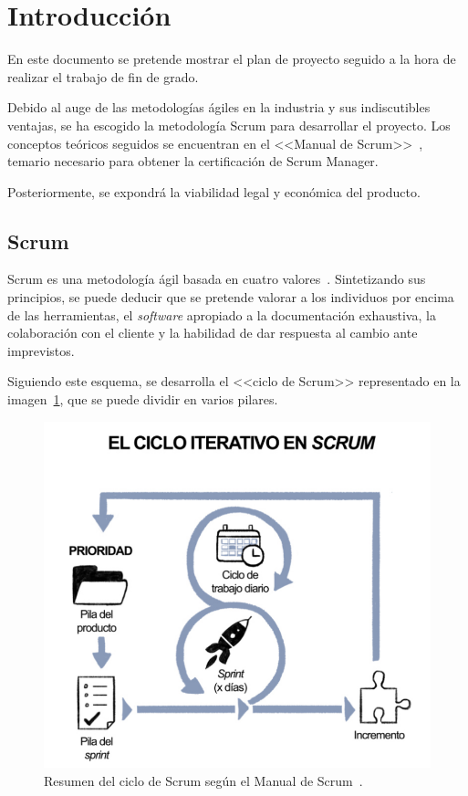 
\section{Introducción}

En este documento se pretende mostrar el plan de proyecto seguido a la hora de realizar el trabajo de fin de grado.

Debido al auge de las metodologías ágiles en la industria y sus indiscutibles ventajas, se ha escogido la metodología Scrum para desarrollar el proyecto. Los conceptos teóricos seguidos se encuentran en el <<Manual de Scrum>>~\cite{scrumMaster2022}, temario necesario para obtener la certificación de Scrum Manager.

Posteriormente, se expondrá la viabilidad legal y económica del producto.

\subsection{Scrum}

Scrum es una metodología ágil basada en cuatro valores~\cite{scrumMaster2022}. Sintetizando sus principios, se puede deducir que se pretende valorar a los individuos por encima de las herramientas, el \textit{software} apropiado a la documentación exhaustiva, la colaboración con el cliente y la habilidad de dar respuesta al cambio ante imprevistos.

Siguiendo este esquema, se desarrolla el <<ciclo de Scrum>> representado en la imagen~\ref{img:ciclo_scrum}, que se puede dividir en varios pilares.

\begin{figure}[h]
	\caption[Resumen del ciclo de Scrum]{Resumen del ciclo de Scrum según el Manual de Scrum~\cite{scrumMaster2022}.}
	\label{img:ciclo_scrum}
	\centering
	\includegraphics[scale=0.45]{../img/anexos/scrum/ciclo}
\end{figure}

